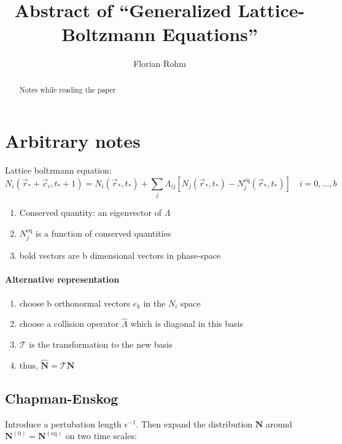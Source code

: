 \documentclass[]{article}
\title{Abstract of ``Generalized Lattice-Boltzmann Equations''}
\author{Florian Rohm}
\begin{document}
\maketitle

\begin{abstract}
Notes while reading the paper
\end{abstract}

\section{Arbitrary notes}

Lattice boltzmann equation:
\[
N_i(\vec{r}_{*} + \vec{c}_i, t_{*} + 1) = N_i (\vec{r}_{*}, t_{*}) + \sum_j \Lambda_{ij} [N_j(\vec{r}_{*}, t_{*}) - N_j^{\text{eq}} (\vec{r}_{*}, t_{*})] \quad i = 0, \dots, b
\]
\begin{enumerate}
  \item Conserved quantity: an eigenvector of $\Lambda$
  \item $N_j^{\text{eq}}$ is a function of conserved quantities
  \item bold vectors are b dimensional vectors in phase-space
\end{enumerate}

\paragraph{Alternative representation}
\label{par:Alternative representation}

\begin{enumerate}
  \item choose b orthonormal vectors $e_k$ in the $N_i$ space
  \item choose a collision operator $\hat{\Lambda}$ which is diagonal in this basis
  \item $\mathcal{T}$ is the transformation to the new basis
  \item thus, $\boldsymbol{\hat{N}} = \mathcal{T} \boldsymbol{N}$
\end{enumerate}

\subsection{Chapman-Enskog}
\label{sub:Chapman-Enskog}
Introduce a pertubation length $\epsilon^{-1}$.
Then expand the distribution $\boldsymbol{N}$ around $\boldsymbol{N}^{(0)} = \boldsymbol{N}^{(\text{eq})}$ on two time scales:
\end{document}
